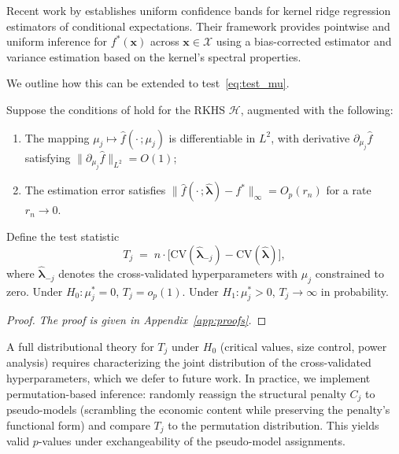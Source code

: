 Recent work by \citet*{SinghVijaykumar2023} establishes uniform
confidence bands for kernel ridge regression estimators of conditional
expectations.
Their framework provides pointwise and uniform inference for
$f^*(\mathbf{x})$ across $\mathbf{x} \in \mathcal{X}$ using
a bias-corrected estimator and variance estimation based on the
kernel's spectral properties.

We outline how this can be extended to test~\eqref{eq:test_mu}.

\begin{proposition}
\label{prop:test_mu}
Suppose the conditions of \citet*{SinghVijaykumar2023} hold for
the RKHS $\mathcal{H}$, augmented with the following:
\begin{enumerate}[label=\textnormal{(T\arabic*)}]
\item \label{cond:test_smooth}
  The mapping $\mu_j \mapsto \hat{f}(\cdot\,; \mu_j)$ is differentiable
  in $L^2$, with derivative $\partial_{\mu_j} \hat{f}$ satisfying
  $\|\partial_{\mu_j} \hat{f}\|_{L^2} = O(1)$;
\item \label{cond:test_rate}
  The estimation error satisfies
  $\|\hat{f}(\cdot\,; \hat{\boldsymbol{\lambda}}) - f^*\|_\infty = O_p(r_n)$
  for a rate $r_n \to 0$.
\end{enumerate}
Define the test statistic
\begin{equation}
\label{eq:T_stat}
T_j \;=\;
n \cdot \bigl[\mathrm{CV}(\hat{\boldsymbol{\lambda}}_{-j})
- \mathrm{CV}(\hat{\boldsymbol{\lambda}})\bigr],
\end{equation}
where $\hat{\boldsymbol{\lambda}}_{-j}$ denotes the cross-validated
hyperparameters with $\mu_j$ constrained to zero.
Under $H_0\!: \mu_j^* = 0$, $T_j = o_p(1)$.
Under $H_1\!: \mu_j^* > 0$, $T_j \to \infty$ in probability.
\end{proposition}

\begin{proof}
\emph{The proof is given in Appendix~\ref{app:proofs}.}
\end{proof}

\begin{remark}
\label{rem:permutation}
A full distributional theory for $T_j$ under $H_0$ (critical values,
size control, power analysis) requires characterizing the joint
distribution of the cross-validated hyperparameters, which we defer
to future work.
In practice, we implement permutation-based inference:
randomly reassign the structural penalty $C_j$ to pseudo-models
(scrambling the economic content while preserving the penalty's
functional form) and compare $T_j$ to the permutation distribution.
This yields valid $p$-values under exchangeability of the
pseudo-model assignments.
\end{remark}

